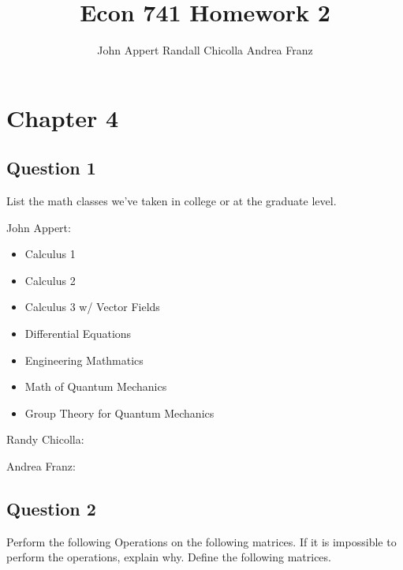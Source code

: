 \documentclass{article}
\begin{document}
\title{Econ 741 Homework 2}
\author{John Appert Randall Chicolla Andrea Franz}
\maketitle

\section{Chapter 4}

\subsection{Question 1}

List the math classes we've taken in college or at the graduate level.

John Appert:

\begin{itemize}
\item Calculus 1
\item Calculus 2
\item Calculus 3 w/ Vector Fields
\item Differential Equations
\item Engineering Mathmatics
\item Math of Quantum Mechanics
\item Group Theory for Quantum Mechanics
\end{itemize}

Randy Chicolla:

\begin{itemize}

\end{itemize}

Andrea Franz:

\begin{itemize}

\end{itemize}

\subsection{Question 2}

Perform the following Operations on the following matrices. If it is impossible to perform the operations, explain why. Define the following matrices. \\
\end{document}
